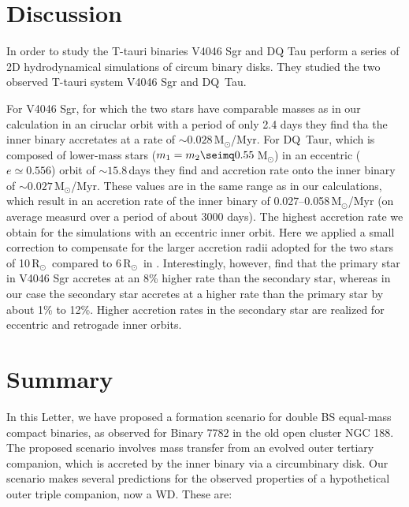\documentclass{aastex62}
\newcommand{\MSun}{\mbox{M$_\odot$}}
\newcommand{\RSun}{\mbox{R$_\odot$}}
\begin{document}
\section{Discussion} \label{sect:discussion}

In order to study the T-tauri binaries V4046 Sgr and DQ Tau
\cite{2011MNRAS.413.2679D} perform a series of 2D hydrodynamical
simulations of circum binary disks.  They studied the two observed
T-tauri system V4046 Sgr and DQ~Tau.

For V4046 Sgr, for which the two stars have comparable masses as in
our calculation in an ciruclar orbit with a period of only 2.4 days
they find tha the inner binary accretates at a rate of $\sim
0.028$\,\MSun/Myr.  For DQ~Taur, which is composed of lower-mass stars
($m_1 = m_2 \seimq 0.55$\,\MSun) in an eccentric ($e\simeq 0.556$)
orbit of $\sim 15.8$\,days they find and accretion rate onto the inner
binary of $\sim 0.027$\,\MSun/Myr.  These values are in the same range
as in our calculations, which result in an accretion rate of the inner
binary of 0.027--0.058\,\MSun/Myr (on average measurd over a period of
about 3000 days).  The highest accretion rate we obtain for the
simulations with an eccentric inner orbit. Here we applied a small
correction to compensate for the larger accretion radii adopted for
the two stars of 10\,\RSun\, compared to 6\,\RSun\, in
\cite{2011MNRAS.413.2679D}. Interestingly, however,
\cite{2011MNRAS.413.2679D} find that the primary star in V4046 Sgr
accretes at an 8\% higher rate than the secondary star, whereas in our
case the secondary star accretes at a higher rate than the primary
star by about 1\% to 12\%.  Higher accretion rates in the secondary
star are realized for eccentric and retrogade inner orbits.

\section{Summary} \label{sect:conclusions}

In this Letter, we have proposed a formation scenario for double BS
equal-mass compact binaries, as observed for Binary 7782 in the old
open cluster NGC 188.  The proposed scenario involves mass transfer
from an evolved outer tertiary companion, which is accreted by the
inner binary via a circumbinary disk.  Our scenario makes several
predictions for the observed properties of a hypothetical outer triple
companion, now a WD.  These are:
\end{document}
